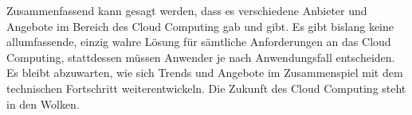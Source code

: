 

Zusammenfassend kann gesagt werden, dass es verschiedene Anbieter und Angebote im Bereich des Cloud Computing gab und gibt. 
Es gibt bislang keine allumfassende, einzig wahre Lösung für sämtliche Anforderungen an das Cloud Computing, stattdessen müssen Anwender je nach Anwendungsfall entscheiden. 
Es bleibt abzuwarten, wie sich Trends und Angebote im Zusammenspiel mit dem technischen Fortschritt weiterentwickeln. 
Die Zukunft des Cloud Computing steht in den Wolken.